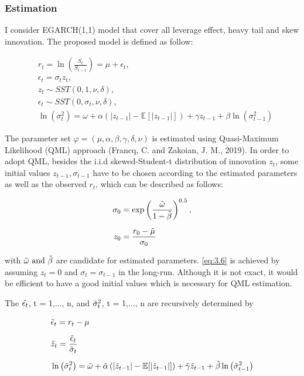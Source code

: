 \documentclass[12pt,a4paper]{article}
\numberwithin{equation}{section}
\begin{document}
\subsubsection{Estimation}

I consider EGARCH(1,1) model that cover all leverage effect, heavy tail and skew innovation. The proposed model is defined as follow:

\begin{align*}
 &r_t = \ln \left(\frac{S_t}{S_{t-1}}\right) = \mu + \epsilon_t ,\\[0.6em]
 &\epsilon_t = \sigma_t z_t,\\[0.6em]
 &z_t \sim SST(0, 1, \nu, \delta), \\[0.6em]
 &\epsilon_t \sim SST(0, \sigma_t, \nu, \delta), \\[0.6em]
 &\ln\left(\sigma_t^2\right) = \omega + \alpha \left( |z_{t-1}| - \mathbb{E}[|z_{t-1}|] \right) + \gamma z_{t-1} +  \beta \ln\left(\sigma_{t-1}^2\right)
 \end{align*}

The parameter set $ \varphi = (\mu, \alpha, \beta, \gamma, \delta, \nu)$ is estimated using Quasi-Maximum Likelihood (QML) approach (Francq, C. and Zakoian, J. M., 2019). In order to adopt QML, besides the i.i.d skewed-Student-t distribution of innovation $z_t$, some initial values $z_{t-1}, \sigma_{t-1}$  have to be chosen according to the estimated parameters as well as the observed $r_t$, which can be described as follows:

\begin{align}
\sigma_{0} &= \exp \left( \frac{\Tilde{\omega}}{1-\Tilde{\beta}} \right)^{0.5}, \label{eq:3.6}\\[0.6em]
z_{0} &= \frac{r_{0} - \Tilde{\mu}}{\sigma_{0}}
\end{align}

with $\Tilde{\omega} \text{ and } \Tilde{\beta}$ are candidate for estimated parameters. \eqref{eq:3.6} is achieved by assuming $z_t = 0$ and $\sigma_t = \sigma_{t-1}$ in the long-run. Although it is not exact, it would be efficient to have a good initial values which is necessary for QML estimation.

The $\Tilde{\epsilon_t}$, t = 1,..., n, and $\Tilde{\sigma}^2_t$, t = 1,..., n are recursively determined by

\begin{align*}
& \Tilde{\epsilon}_t = r_t - \mu \\[0.6em]
& \Tilde{z}_t = \frac{\Tilde{\epsilon}_t}{\Tilde{\sigma}_t}\\[0.6em]
 &\ln\left(\Tilde{\sigma}_t^2\right) = \Tilde{\omega} + \Tilde{\alpha} \left( |\Tilde{z}_{t-1}| - \mathbb{E}[|\Tilde{z}_{t-1}|] \right) + \Tilde{\gamma} \Tilde{z}_{t-1} +  \Tilde{\beta} \ln\left(\Tilde{\sigma}_{t-1}^2\right)
\end{align*}
\end{document}
